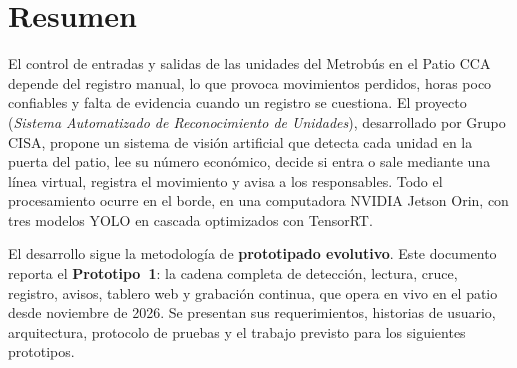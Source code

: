 \chapter*{Resumen}

El control de entradas y salidas de las unidades del Metrobús en el Patio
CCA depende del registro manual, lo que provoca movimientos perdidos, horas
poco confiables y falta de evidencia cuando un registro se cuestiona. El
proyecto \saru{} (\emph{Sistema Automatizado de Reconocimiento de
Unidades}), desarrollado por Grupo CISA, propone un sistema de visión
artificial que detecta cada unidad en la puerta del patio, lee su número
económico, decide si entra o sale mediante una línea virtual, registra el
movimiento y avisa a los responsables. Todo el procesamiento ocurre en el
borde, en una computadora NVIDIA Jetson Orin, con tres modelos YOLO en
cascada optimizados con TensorRT.

El desarrollo sigue la metodología de \textbf{prototipado evolutivo}. Este
documento reporta el \textbf{Prototipo~1}: la cadena completa de
detección, lectura, cruce, registro, avisos, tablero web y grabación
continua, que opera en vivo en el patio desde noviembre de 2026. Se
presentan sus requerimientos, historias de usuario, arquitectura, protocolo
de pruebas y el trabajo previsto para los siguientes prototipos.
